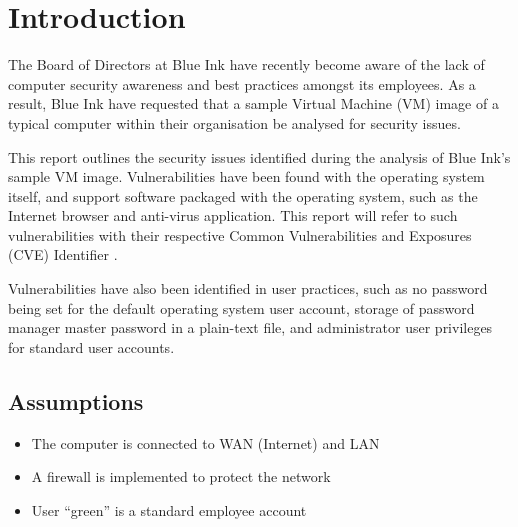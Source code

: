 \section{Introduction}

The Board of Directors at Blue Ink have recently become aware of the lack of computer security awareness and best practices amongst its employees. As a result, Blue Ink have requested that a sample Virtual Machine (VM) image of a typical computer within their organisation be analysed for security issues.

This report outlines the security issues identified during the analysis of Blue Ink's sample VM image. Vulnerabilities have been found with the operating system itself, and support software packaged with the operating system, such as the Internet browser and anti-virus application. This report will refer to such vulnerabilities with their respective Common Vulnerabilities and Exposures (CVE) Identifier \citep{MITRE2015}.

Vulnerabilities have also been identified in user practices, such as no password being set for the default operating system user account, storage of password manager master password in a plain-text file, and administrator user privileges for standard user accounts.


\subsection{Assumptions}

\begin{itemize}
\item The computer is connected to WAN (Internet) and LAN
\item A firewall is implemented to protect the network
\item User ``green'' is a standard employee account
\end{itemize}
